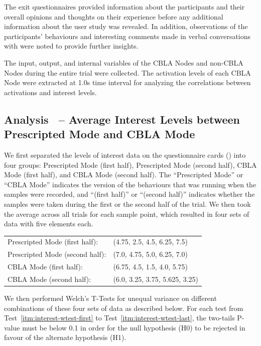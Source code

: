 The exit questionnaires provided information about the participants and their overall opinions and thoughts on their experience before any additional information about the user study was revealed. In addition, observations of the participants' behaviours and interesting comments made in verbal conversations with were noted to provide further insights.

The input, output, and internal variables of the CBLA Nodes and non-CBLA Nodes during the entire trial were collected. The activation levels of each CBLA Node were extracted at 1.0s time interval for analyzing the correlations between activations and interest levels. 


 
\subsection{Analysis~ -- Average Interest Levels between Prescripted Mode and CBLA Mode} \label{sec:user-study-analysis-interest}

We first separated the levels of interest data on the questionnaire cards () into four groups: Prescripted Mode (first half),  Prescripted Mode (second half),  CBLA Mode (first half), and CBLA Mode (second half). The ``Prescripted Mode'' or ``CBLA Mode'' indicates the version of the behaviours that was running when the samples were recorded, and ``(first half)'' or ``(second half)'' indicates whether the samples were taken during the first or the second half of the trial. We then took the average across all trials for each sample point, which resulted in four sets of data with five elements each.

\begin{tabular}{l l}
	Prescripted Mode (first half):      &(4.75, 2.5, 4.5, 6.25, 7.5) \\
	Prescripted Mode (second half):     &(7.0, 4.75, 5.0, 6.25, 7.0) \\
	CBLA Mode (first half):             &(6.75, 4.5, 1.5, 4.0, 5.75) \\
	CBLA Mode (second half):            &(6.0, 3.25, 3.75, 5.625, 3.25)	
\end{tabular}

We then performed Welch's T-Tests for unequal variance on different combinations of these four sets of data as described below. For each test from Test~\ref{itm:interest-wtest-first} to Test~\ref{itm:interest-wtest-last}, the two-tails P-value must be below 0.1 in order for the null hypothesis (H0) to be rejected in favour of the alternate hypothesis (H1).

